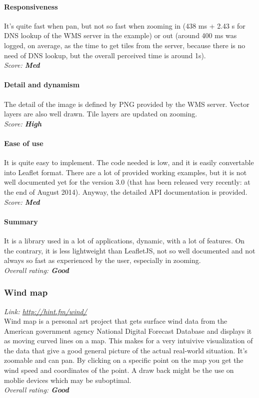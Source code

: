 \documentclass[11pt,a4paper,titlepage,oneside]{report}
\begin{document}
   \paragraph{Responsiveness}
   It's quite fast when pan, but not so fast when zooming in (438 ms + 2.43 s for DNS lookup of the \gls{WMS} server in the example) or out (around 400 ms was logged, on average, as the time to get tiles from the server, because there is no need of DNS lookup, but the overall perceived time is around 1s).
   \\ \emph{Score: \textbf{Med}}
   \paragraph{Detail and dynamism}
   The detail of the image is defined by \gls{PNG} provided by the \gls{WMS} server. Vector layers are also well drawn. Tile layers are updated on zooming.
   \\ \emph{Score: \textbf{High}}
   \paragraph{Ease of use}
   It is quite easy to implement. The code needed is low, and it is easily convertable into Leaflet format. There are a lot of provided working examples, but it is not well documented yet for the version 3.0 (that has been released very recently: at the end of August 2014). Anyway, the detailed API documentation is provided.
   \\ \emph{Score: \textbf{Med}}
   \paragraph{Summary}
   It is a library used in a lot of applications, dynamic, with a lot of features. On the contrary, it is less lightweight than LeafletJS, not so well documented and not always so fast as experienced by the user, especially in zooming.
   \\ \emph{Overall rating: \textbf{Good}}
  
  \subsubsection{Wind map}
  \emph{Link: \url{http://hint.fm/wind/}} \\%
    Wind map is a personal art project that gets surface wind data from the American government agency National Digital Forecast Database and displays it as moving curved lines on a map. This makes for a very intuivive visualization of the data that give a good general picture of the actual real-world situation. It's zoomable and can pan. By clicking on a specific point on the map you get the wind speed and coordinates of the point. A draw back might be the use on moblie devices which may be suboptimal.
  \\ \emph{Overall rating: \textbf{Good}}
\end{document}
